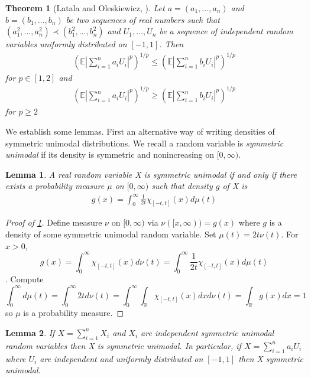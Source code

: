 \documentclass[10pt]{article}
\newcommand{\E}{\mathbb{E}}
\newcommand{\1}{\textbf{1}}
\newcommand{\R}{\mathbb{R}}
\newtheorem{theorem}{Theorem}[subsection]
\newtheorem{lemma}{Lemma}[subsection]
\theoremstyle{remark}
\theoremstyle{definition}
\begin{document}
\begin{theorem}[Latala and Oleskiewicz, \cite{LO}]\label{thm:URV1}
	Let $a = (a_1,...,a_n)$ and $b=(b_1,...,b_n)$ be two sequences of real numbers such that $(a_1^2,...,a_n^2) \prec (b_1^2,...,b_n^2)$ and $U_1,...,U_n$ be a sequence of independent random variables uniformly distributed on $[-1,1]$. Then
	\begin{align*}
		(\E |\sum_{i=1}^n a_iU_i|^p)^{1/p}\leq (\E |\sum_{i=1}^nb_iU_i|^p)^{1/p}
	\end{align*}
	for $p \in [1,2]$ and
	\begin{align*}
		(\E |\sum_{i=1}^n a_iU_i|^p)^{1/p} \geq (\E |\sum_{i=1}^n b_iU_i|^p)^{1/p}
	\end{align*}
	for $p \geq 2$
\end{theorem}



We establish some lemmas. First an alternative way of writing densities of symmetric unimodal distributions. We recall a random variable is \textit{symmetric unimodal} if its density is symmetric and nonincreasing on $[0,\infty)$. 

\begin{lemma}\label{lem:URV1}
	A real random variable X is symmetric unimodal if and only if there exists a probability measure $\mu$ on $[0,\infty)$ such that density $g$ of X is 
	\begin{align*}
		g(x) = \int_0^{\infty}\frac{1}{2t}\chi_{[-t,t]}(x)d\mu(t)
	\end{align*}
\end{lemma}

\begin{proof}[Proof of \ref{lem:URV1}]
	Define measure $\nu$ on $[0,\infty)$ via $\nu([x,\infty)) = g(x)$ where $g$ is a density of some symmetric unimodal random variable. Set $\mu(t) = 2 t\nu(t)$. For $x > 0$,
	\begin{equation*}
		g(x) = \int_0^{\infty}\chi_{[-t,t]}(x) d\nu(t) = \int_0^{\infty} \frac{1}{2t}\chi_{[-t,t]}(x)d\mu(t)
	\end{equation*}.
	Compute
	\begin{equation*}
		\int_0^{\infty}d\mu(t) = \int_0^{\infty} 2td\nu(t) = \int_0^{\infty} \int_{\R} \chi_{[-t,t]}(x)dxd\nu(t) = \int_{\R} g(x) dx = 1
	\end{equation*}
	so $\mu$ is a probability measure.
\end{proof}

\begin{lemma}\label{lem:URV2}
	If $X = \sum_{i=1}^n X_i$ and $X_i$ are independent symmetric unimodal random variables then X is symmetric unimodal. In particular, if $X = \sum_{i=1}^n a_i U_i$ where $U_i$ are independent and uniformly distributed on $[-1,1]$ then X symmetric unimodal. 
\end{lemma}
\end{document}
